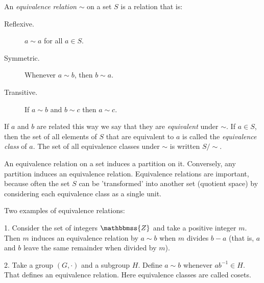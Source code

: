 \documentclass{article}
\newcommand{\Z}{\mathbbmss{Z}}
\begin{document}
An \emph{equivalence relation} $\sim$ on a set $S$ is a relation that is:
\begin{description}
\item[Reflexive.] $a\sim a$ for all $a\in S$.
\item[Symmetric.] Whenever $a\sim b$, then $b\sim a$.
\item[Transitive.] If $a\sim b$ and $b\sim c$ then $a\sim c$.
\end{description}
If $a$ and $b$ are related this way we say that they are \emph{equivalent} under $\sim$.
If $a\in S$, then the set of all elements of $S$ that are equivalent to $a$ is called the \emph{equivalence class} of $a$.  The set of all equivalence classes under $\sim$ is written $S/\sim$.

An equivalence relation on a set induces a partition on it.  Conversely, any partition induces an equivalence relation. Equivalence relations are important, because often the set $S$ can be 'transformed' into another set (quotient space) by considering each equivalence class as a single unit.

Two examples of equivalence relations:

1. Consider the set of integers $\Z$ and take a positive integer $m$. Then $m$ induces an equivalence relation by $a\sim b$ when $m$ divides $b-a$ (that is, $a$ and $b$ leave the same remainder when divided by $m$).

2. Take a group $(G,\cdot)$ and a subgroup $H$. Define $a\sim b$ whenever $ab^{-1}\in H$. That defines an equivalence relation. Here equivalence classes are called cosets.
\end{document}
